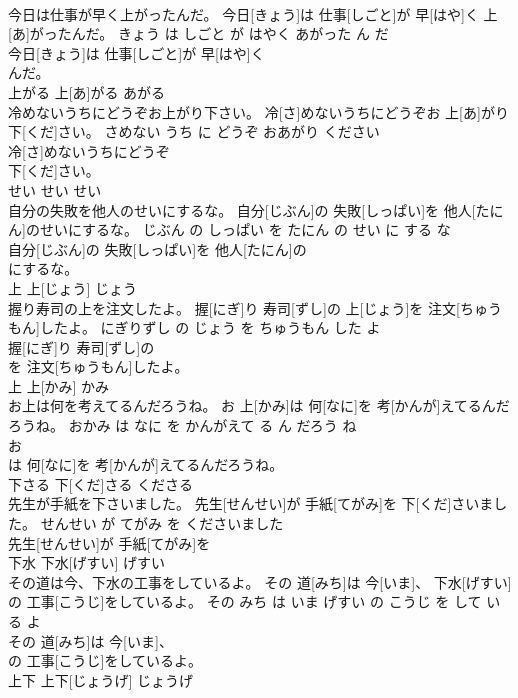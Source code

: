 \documentclass[8pt]{extreport}
\begin{document}
\begin{CJK}{UTF8}{min}
\\	今日は仕事が早く上がったんだ。	今日[きょう]は 仕事[しごと]が 早[はや]く 上[あ]がったんだ。	きょう は しごと が はやく あがった ん だ	
\\	今日[きょう]は 仕事[しごと]が 早[はや]く
\\	んだ。			
\\	上がる	上[あ]がる	あがる	
\\	冷めないうちにどうぞお上がり下さい。	冷[さ]めないうちにどうぞお 上[あ]がり 下[くだ]さい。	さめない うち に どうぞ おあがり ください	
\\	冷[さ]めないうちにどうぞ
\\	下[くだ]さい。			
\\	せい	せい	せい	
\\	自分の失敗を他人のせいにするな。	自分[じぶん]の 失敗[しっぱい]を 他人[たにん]のせいにするな。	じぶん の しっぱい を たにん の せい に する な	
\\	自分[じぶん]の 失敗[しっぱい]を 他人[たにん]の
\\	にするな。			
\\	上	上[じょう]	じょう	
\\	握り寿司の上を注文したよ。	握[にぎ]り 寿司[ずし]の 上[じょう]を 注文[ちゅうもん]したよ。	にぎりずし の じょう を ちゅうもん した よ	
\\	握[にぎ]り 寿司[ずし]の
\\	を 注文[ちゅうもん]したよ。			
\\	上	上[かみ]	かみ	
\\	お上は何を考えてるんだろうね。	お 上[かみ]は 何[なに]を 考[かんが]えてるんだろうね。	おかみ は なに を かんがえて る ん だろう ね	
\\	お
\\	は 何[なに]を 考[かんが]えてるんだろうね。			
\\	下さる	下[くだ]さる	くださる	
\\	先生が手紙を下さいました。	先生[せんせい]が 手紙[てがみ]を 下[くだ]さいました。	せんせい が てがみ を くださいました	
\\	先生[せんせい]が 手紙[てがみ]を
\\	下水	下水[げすい]	げすい	
\\	その道は今、下水の工事をしているよ。	その 道[みち]は 今[いま]、 下水[げすい]の 工事[こうじ]をしているよ。	その みち は いま げすい の こうじ を して いる よ	
\\	その 道[みち]は 今[いま]、
\\	の 工事[こうじ]をしているよ。			
\\	上下	上下[じょうげ]	じょうげ	

\end{CJK}
\end{document}
